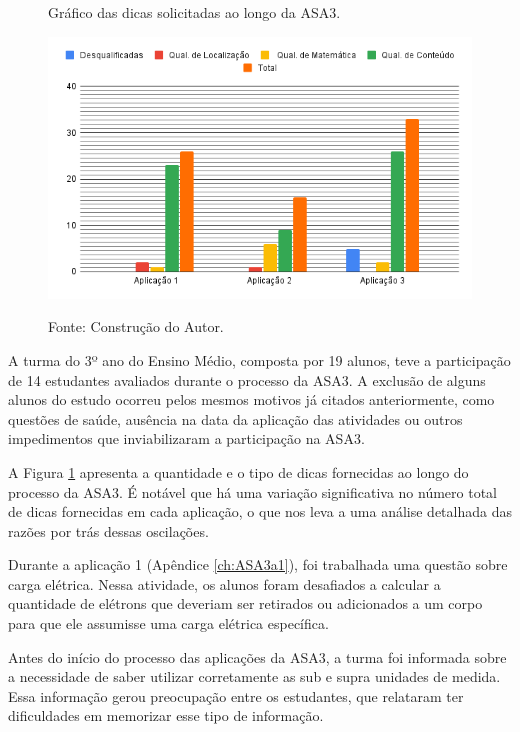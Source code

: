 \begin{figure}[ht]
\begin{center}
\caption{Gráfico das dicas solicitadas ao longo da ASA3.}
\includegraphics[width=1\textwidth]{fig/graficoDicasASA3.png}
\label{fig:dicasASA3}
\caption*{Fonte: Construção do Autor.}
\end{center}
\end{figure}

A turma do 3º ano do Ensino Médio, composta por 19 alunos, teve a participação de 14 estudantes avaliados durante o processo da ASA3. A exclusão de alguns alunos do estudo ocorreu pelos mesmos motivos já citados anteriormente, como questões de saúde, ausência na data da aplicação das atividades ou outros impedimentos que inviabilizaram a participação na ASA3.

A Figura \ref{fig:dicasASA3} apresenta a quantidade e o tipo de dicas fornecidas ao longo do processo da ASA3. É notável que há uma variação significativa no número total de dicas fornecidas em cada aplicação, o que nos leva a uma análise detalhada das razões por trás dessas oscilações.

Durante a aplicação 1 (Apêndice \ref{ch:ASA3a1}), foi trabalhada uma questão sobre carga elétrica. Nessa atividade, os alunos foram desafiados a calcular a quantidade de elétrons que deveriam ser retirados ou adicionados a um corpo para que ele assumisse uma carga elétrica específica.

Antes do início do processo das aplicações da ASA3, a turma foi informada sobre a necessidade de saber utilizar corretamente as sub e supra unidades de medida. Essa informação gerou preocupação entre os estudantes, que relataram ter dificuldades em memorizar esse tipo de informação. 


